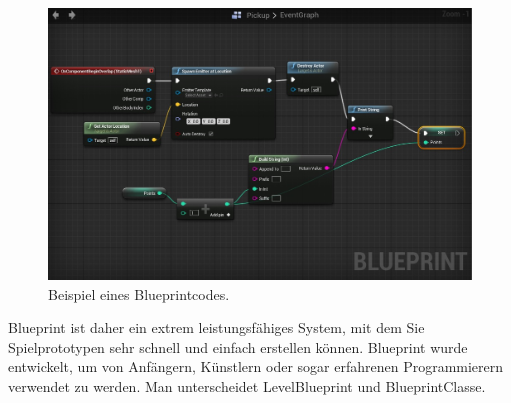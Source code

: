 \begin{figure}[h] \centering
\includegraphics[width=13cm]{Images/blueprint.png} 
\caption[]{ Beispiel eines Blueprintcodes. }
\label{vr-blueprint} 
\end{figure}

Blueprint ist daher ein extrem leistungsfähiges System, mit dem Sie Spielprototypen sehr schnell und einfach erstellen können. 
Blueprint wurde entwickelt, um von Anfängern, Künstlern oder sogar erfahrenen Programmierern verwendet zu werden. 
Man unterscheidet LevelBlueprint und BlueprintClasse.




